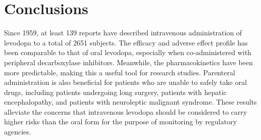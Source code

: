 \section{Conclusions}
Since 1959, at least 139 reports have described intravenous administration of levodopa to a total of 2651 subjects. The efficacy and adverse effect profile has been comparable to that of oral levodopa, especially when co-administered with peripheral decarboxylase inhibitors. Meanwhile, the pharmacokinetics have been more predictable, making this a useful tool for research studies. Parenteral administration is also beneficial for patients who are unable to safely take oral drugs, including patients undergoing long surgery, patients with hepatic encephalopathy, and patients with neuroleptic malignant syndrome. These results alleviate the concerns that intravenous levodopa should be considered to carry higher risks than the oral form for the purpose of monitoring by regulatory agencies.